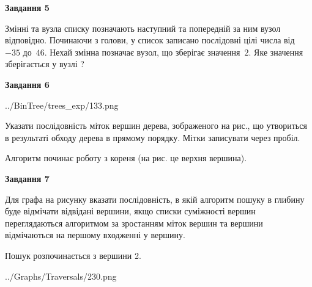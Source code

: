 \documentclass[12pt, ukrainian]{article}
\begin{document}
{\begin {large}
{\begin {center}\textbf{Завдання 5}\end {center}}\par
Змінні  та  вузла списку позначають наступний та попередній за ним вузол відповідно. Починаючи з голови, у список записано послідовні цілі числа від~$-35$ до~$46$. Нехай змінна  позначає вузол, що зберігає значення~$2$.
Яке значення зберігається у вузлі  ?\par
\newpage

{\begin {center}\textbf{Завдання 6}\end {center}}\par

\begin{center}
	{../BinTree/trees_exp/133.png}
\end{center}
Указати послідовність міток вершин дерева, зображеного на рис., що утвориться в результаті обходу дерева в прямому порядку. Мітки записувати через пробіл.\par Алгоритм починає роботу з кореня (на рис. це верхня вершина).\par
\newpage

{\begin {center}\textbf{Завдання 7}\end {center}}\par
Для графа на рисунку вказати послідовність, в якій алгоритм пошуку в глибину буде відмічати відвідані вершини, якщо списки суміжності вершин переглядаються алгоритмом за зростанням міток вершин та вершини відмічаються на першому вход\-женні у вершину.\par
Пошук розпочинається з вершини 2.\par

\begin{center}
	{../Graphs/Traversals/230.png}
\end{center}\par
\newpage


\end{large}}
\end{document}
